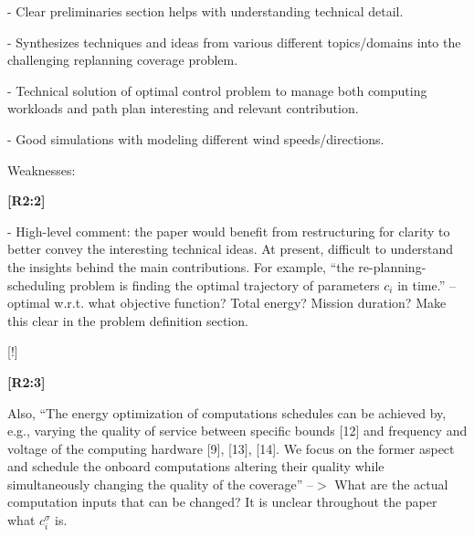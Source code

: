 \documentclass[10pt]{letter}
\begin{document}
- Clear preliminaries section helps with understanding technical detail.

- Synthesizes techniques and ideas from various different topics/domains into the challenging replanning coverage problem.

- Technical solution of optimal control problem to manage both computing workloads and path plan interesting and relevant contribution.
  
- Good simulations with modeling different wind speeds/directions.

\vspace{2em}

Weaknesses:

  
{\hspace*{-4.5em}\textbf{[R2:2]}\vspace*{-1.9em}}
  
- High-level comment: the paper would benefit from restructuring for clarity to better convey the interesting technical ideas. At present, difficult to understand the insights behind the main contributions. For example, ``the re-planning-scheduling problem is finding the optimal trajectory of parameters $c_i$ in time.'' -- optimal w.r.t. what objective function? Total energy? Mission duration? Make this clear in the problem definition section. 
  
{\color{blue} 

{\hspace*{-4.5em}{[R2:2]}\vspace*{-1.9em}}

[!]
}
  
  {\hspace*{-4.5em}\textbf{[R2:3]}\vspace*{-1.9em}}

  Also, ``The energy optimization of computations schedules can be achieved by, e.g., varying the quality of service between specific bounds [12] and frequency and voltage of the computing hardware [9], [13], [14]. We focus on the former aspect and schedule the onboard computations altering their quality while simultaneously changing the quality of the coverage'' --$>$ What are the actual computation inputs that can be changed? It is unclear throughout the paper what $c_i^\sigma$ is. 
  
\end{document}
